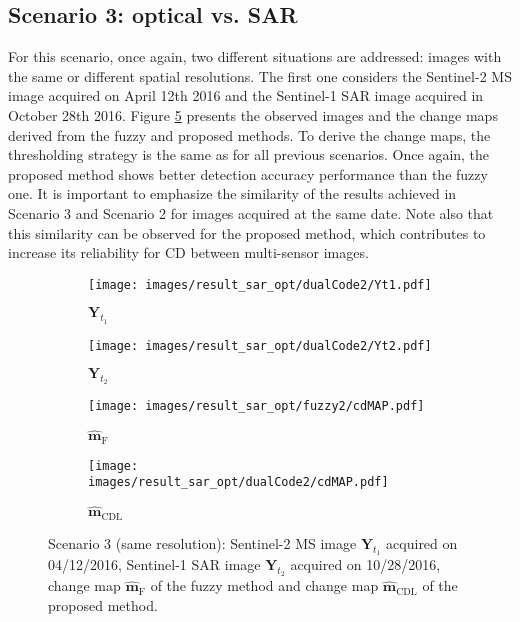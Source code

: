 \documentclass[review]{elsarticle}
\begin{document}
\subsection{Scenario 3: optical vs. SAR}

For this scenario, once again, two different situations are addressed: images with the same or different spatial resolutions. The first one considers the Sentinel-2 MS image acquired on April 12th 2016 and the Sentinel-1 SAR image acquired in  October 28th 2016. Figure \ref{fig:realS1S2_2} presents the observed images and the change maps derived from the fuzzy and proposed methods. To derive the change maps, the thresholding strategy is the same as for all previous scenarios. Once again, the proposed method shows better detection accuracy performance than the fuzzy one. It is important to emphasize the similarity of the results achieved in Scenario 3 and Scenario 2 for images acquired at the same date. Note also that this similarity can be observed for the proposed method, which contributes to increase its reliability for CD between multi-sensor images.

\begin{figure}[h!]
\centering
			\begin{subfigure}{\subfwidth}
					\centering	
					\texttt{[image: images/result\_sar\_opt/dualCode2/Yt1.pdf]}
					\caption{$\mathbf{Y}_{t_1}$}
					\label{fig:s1s2Yt1_2}
			\end{subfigure}
			\begin{subfigure}{\subfwidth}
					\centering	
					\texttt{[image: images/result\_sar\_opt/dualCode2/Yt2.pdf]}
					\caption{$\mathbf{Y}_{t_2}$}
					\label{fig:s1s2Yt2_2}
			\end{subfigure}
            \begin{subfigure}{\subfwidth}
					\centering
					\texttt{[image: images/result\_sar\_opt/fuzzy2/cdMAP.pdf]}
					\caption{$\hat{\mathbf{m}}_{\mathrm{F}}$}
					\label{fig:s1s2FMAP_2}
			\end{subfigure}
			\begin{subfigure}{\subfwidth}
					\centering	
					\texttt{[image: images/result\_sar\_opt/dualCode2/cdMAP.pdf]}
					\caption{$\hat{\mathbf{m}}_{\mathrm{CDL}}$}
					\label{fig:s1s2DCMAP_2}
			\end{subfigure}
\caption{Scenario 3 (same resolution): \protect{}  Sentinel-2 MS image $\mathbf{Y}_{t_1}$ acquired on 04/12/2016, \protect{}  Sentinel-1 SAR image $\mathbf{Y}_{t_2}$ acquired on 10/28/2016, \protect{} change map $\hat{\mathbf{m}}_{\mathrm{F}}$ of the fuzzy method and \protect{} change map $\hat{\mathbf{m}}_{\mathrm{CDL}}$ of the proposed method.}%
	\label{fig:realS1S2_2}%
\end{figure}
\end{document}
